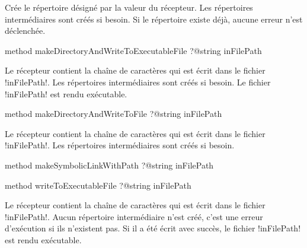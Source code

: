 Crée le répertoire désigné par la valeur du récepteur. Les répertoires intermédiaires sont créés si besoin. Si le répertoire existe déjà, aucune erreur n'est déclenchée.







\begin{galgasbox}
method makeDirectoryAndWriteToExecutableFile ?@string inFilePath
\end{galgasbox}

Le récepteur contient la chaîne de caractères qui est écrit dans le fichier \ggs!inFilePath!. Les répertoires intermédiaires sont créés si besoin. Le fichier \ggs!inFilePath! est rendu exécutable.








\begin{galgasbox}
method makeDirectoryAndWriteToFile ?@string inFilePath
\end{galgasbox}

Le récepteur contient la chaîne de caractères qui est écrit dans le fichier \ggs!inFilePath!. Les répertoires intermédiaires sont créés si besoin.









\begin{galgasbox}
method makeSymbolicLinkWithPath ?@string inFilePath
\end{galgasbox}









\begin{galgasbox}
method writeToExecutableFile ?@string inFilePath
\end{galgasbox}

Le récepteur contient la chaîne de caractères qui est écrit dans le fichier \ggs!inFilePath!. Aucun répertoire intermédiaire n'est créé, c'est une erreur d'exécution si ils n'existent pas. Si il a été écrit avec succès, le fichier \ggs!inFilePath! est rendu exécutable.









